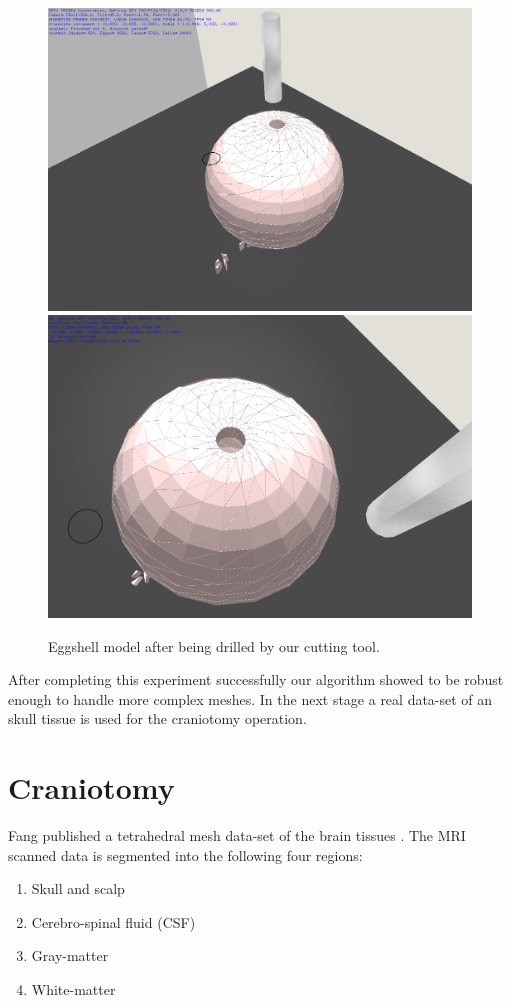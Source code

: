 \begin{figure}[H]
  \centering
  \includegraphics[width=0.6\linewidth]{figures/evaluation/eggshell02.png}
  \includegraphics[width=0.6\linewidth]{figures/evaluation/eggshell03.png}
  \caption{\label{fig:eggshell02}
  {Eggshell model after being drilled by our cutting tool.}
}
\end{figure}

After completing this experiment successfully our algorithm showed to be robust enough to handle 
more complex meshes. In the next stage a real data-set of an skull tissue is used for the craniotomy operation.

\section{Craniotomy}
\label{sec:craniotomy}
Fang \etal published a tetrahedral mesh data-set of the brain tissues \cite{fang2010mesh}. The MRI scanned data is 
segmented into the following four regions:

\begin{enumerate}
 \item Skull and scalp
 \item Cerebro-spinal fluid (CSF)
 \item Gray-matter
 \item White-matter
\end{enumerate}

